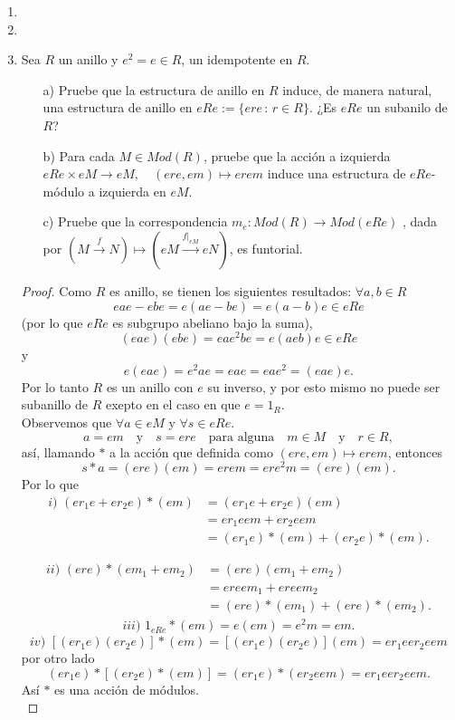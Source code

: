 \documentclass{article}
\theoremstyle{definition}
\theoremstyle{plain}
\theoremstyle{plain}
\theoremstyle{definition}
\theoremstyle{definition}
\theoremstyle{definition}
\theoremstyle{definition}
\theoremstyle{definition}
\theoremstyle{definition}
\begin{document}
\begin{enumerate}[label=\textbf{Ej \arabic*.}]
\item
\item
\item Sea $R$ un anillo y $e^2=e\in R$, un idempotente en $R$.
\begin{itemize}
\item[a)] Pruebe que la estructura de anillo en $R$ induce, de manera natural, una estructura de anillo en $eRe:=\{ere\,\colon\,r\in R\}$.
¿Es $eRe$ un subanilo de $R$?
\item[b)] Para cada $M\in Mod(R)$, pruebe que la acción a izquierda \\
$eRe\times eM\longrightarrow eM,$ \,\, $(ere,em)\mapsto erem$ 
induce una estructura de $eRe$-módulo a izquierda en $eM$.
\item[c)] Pruebe que la correspondencia $m_e:Mod(R)\longrightarrow Mod(eRe)$ , dada por 
$\left(M \stackrel{f}{\longrightarrow} N\right)\longmapsto \left(eM\stackrel{f|_{eM}}{\longrightarrow} eN\right)$, es funtorial.
\end{itemize}
\begin{proof}
 Como $R$ es anillo, se tienen los siguientes resultados: $\forall a,b\in R$
\[eae-ebe=e(ae-be)=e(a-b)e\in eRe\]
(por lo que $eRe$ es subgrupo abeliano bajo la suma),
\[(eae)(ebe)=eae^2be=e(aeb)e\in eRe
\]
y 
\[e(eae)=e^2ae=eae=eae^2=(eae)e.
\]
Por lo tanto $R$ es un anillo con $e$ su inverso, y por esto mismo no puede ser subanillo de $R$ exepto en el caso en que $e=1_R$. \\

 Observemos que $\forall a\in eM$ y $\forall s\in eRe$.
\[a=em\quad \text{y} \quad s=ere\quad \text{para alguna} \quad m\in M\quad \text{y} \quad r\in R,\]
así, llamando $*$ a la acción que definida como $(ere,em)\mapsto erem$, entonces 
\[s*a=(ere)(em)=erem=ere^2m=(ere)(em).
\]
Por lo que 
\begin{align*}
\boxed{i)}\,\,(er_1e+er_2e)*(em)&=(er_1e+er_2e)(em)\\
&=er_1eem+er_2eem\\
&=(er_1e)*(em)+(er_2e)*(em).
\end{align*}

\begin{align*}
\boxed{ii)}\,\, (ere)*(em_1+em_2)&= (ere)(em_1+em_2)\\
&=ereem_1+ereem_2\\
&=(ere)*(em_1)+(ere)*(em_2).
\end{align*}
\begin{align*}
\boxed{iii)}\,\, 1_{eRe}*(em)=e(em)=e^2m=em.
\end{align*}
\[\boxed{iv)}\,\,[(er_1e)(er_2e)]*(em)=[(er_1e)(er_2e)](em)=er_1eer_2eem\]
por otro lado
\[(er_1e)*[(er_2e)*(em)]=(er_1e)*(er_2eem)=er_1eer_2eem.\]
Así $*$ es una acción de módulos.\\


\end{proof}
\end{enumerate}
\end{document}
